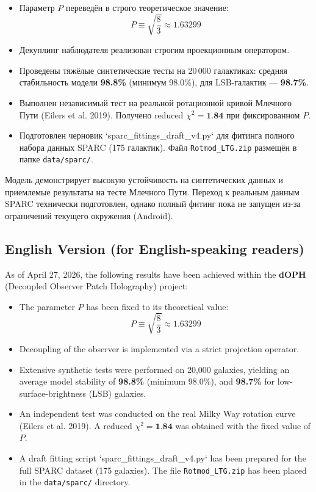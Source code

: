 \documentclass[11pt,a4paper]{article}
\begin{document}
\begin{itemize}
    \item Параметр $P$ переведён в строго теоретическое значение:
    \[
    P \equiv \sqrt{\frac{8}{3}} \approx 1.63299
    \]
    \item Декуплинг наблюдателя реализован строгим проекционным оператором.
    \item Проведены тяжёлые синтетические тесты на 20\,000 галактиках: средняя стабильность модели \textbf{98.8\%} (минимум 98.0\%), для LSB-галактик — \textbf{98.7\%}.
    \item Выполнен независимый тест на реальной ротационной кривой Млечного Пути (Eilers et al. 2019). Получено reduced $\chi^2 = \textbf{1.84}$ при фиксированном $P$.
    \item Подготовлен черновик `sparc_fittings_draft_v4.py` для фитинга полного набора данных SPARC (175 галактик). Файл \texttt{Rotmod\_LTG.zip} размещён в папке \texttt{data/sparc/}.
\end{itemize}

Модель демонстрирует высокую устойчивость на синтетических данных и приемлемые результаты на тесте Млечного Пути. Переход к реальным данным SPARC технически подготовлен, однако полный фитинг пока не запущен из-за ограничений текущего окружения (Android).

\subsection{English Version (for English-speaking readers)}

As of April 27, 2026, the following results have been achieved within the \textbf{dOPH} (Decoupled Observer Patch Holography) project:

\begin{itemize}
    \item The parameter $P$ has been fixed to its theoretical value:
    \[
    P \equiv \sqrt{\frac{8}{3}} \approx 1.63299
    \]
    \item Decoupling of the observer is implemented via a strict projection operator.
    \item Extensive synthetic tests were performed on 20,000 galaxies, yielding an average model stability of \textbf{98.8\%} (minimum 98.0\%), and \textbf{98.7\%} for low-surface-brightness (LSB) galaxies.
    \item An independent test was conducted on the real Milky Way rotation curve (Eilers et al. 2019). A reduced $\chi^2 = \textbf{1.84}$ was obtained with the fixed value of $P$.
    \item A draft fitting script `sparc_fittings_draft_v4.py` has been prepared for the full SPARC dataset (175 galaxies). The file \texttt{Rotmod\_LTG.zip} has been placed in the \texttt{data/sparc/} directory.
\end{itemize}
\end{document}
